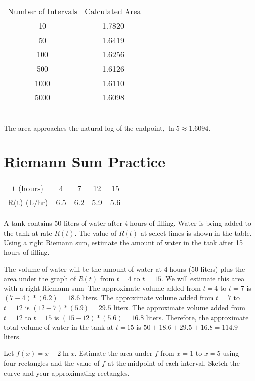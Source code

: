 \begin{Answer}[ref=rsumpython]
	\begin{tabular}{c|c}
	Number of Intervals & Calculated Area\\
	10 & 1.7820 \\
	50 & 1.6419 \\
	100 & 1.6256 \\
	500 & 1.6126 \\
	1000 & 1.6110 \\
	5000 & 1.6098 \\
	\end{tabular}
	\\The area approaches the natural log of the endpoint, $\ln{5} \approx 1.6094$. 
\end{Answer}

\section{Riemann Sum Practice}

\begin{Exercise}[label=rsum2]
	\begin{center}
		\begin{tabular}{c|c|c|c|c}
			t (hours) & 4 & 7 & 12 & 15\\
			R(t) (L/hr) & 6.5 & 6.2 & 5.9 & 5.6\\
		\end{tabular}
	\end{center}
	A tank contains 50 liters of water after 4 hours of filling. Water is being added to the tank at rate $R(t)$. The value of $R(t)$ at select times is shown in the table. Using a right Riemann sum, estimate the amount of water in the tank after 15 hours of filling. 
\end{Exercise}

\begin{Answer}[ref=rsum2]
	The volume of water will be the amount of water at 4 hours (50 liters) plus the area under the graph of $R(t)$ from $t=4$ to $t=15$. We will estimate this area with a right Riemann sum. The approximate volume added from $t=4$ to $t=7$ is $(7-4)*(6.2) = 18.6$ liters. The approximate volume added from $t=7$ to $t=12$ is $(12-7)*(5.9)=29.5$ liters. The approximate volume added from $t=12$ to $t=15$ is $(15-12)*(5.6) = 16.8$ liters. Therefore, the approximate total volume of water in the tank at $t=15$ is $50 + 18.6 + 29.5 + 16.8 = 114.9$ liters. 
\end{Answer}

\begin{Exercise}[label=rsum3]
	Let $f(x) = x-2\ln{x}$. Estimate the area under $f$ from $x=1$ to $x=5$ using four rectangles and the value of $f$ at the midpoint of each interval. Sketch the curve and your approximating rectangles.
\end{Exercise}


